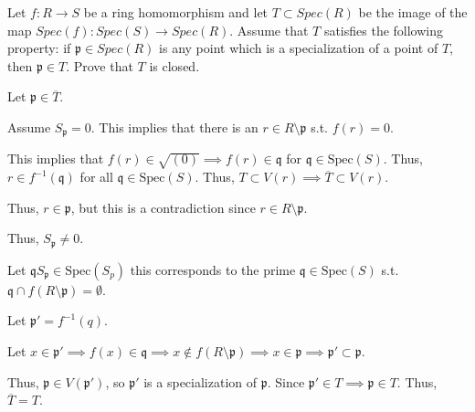 \documentclass[12pt, letterpaper]{article}
\newcommand{\p}{\mathfrak{p}}
\newcommand{\Spec}{\mathrm{Spec}}
\newcommand{\mf}[1]{\mathfrak{#1}}
\begin{document}
\begin{subproblem}{}
    Let $f : R \to S$ be a ring homomorphism and let $T \subset Spec(R)$ be the image of the
map $Spec(f ) : Spec(S) \to Spec(R)$. Assume that $T$ satisfies the following property: if
$\p \in Spec(R)$ is any point which is a specialization of a point of $T$, then $\p \in T$. Prove
that $T$ is closed.
\end{subproblem}
\begin{problemproof}
    Let $\p \in \overline{T}$.

    Assume $S_\p = 0$. This implies that there is an $r \in R \setminus \p$ s.t. $f(r)=0$. 
    
    This implies that $f(r) \in \sqrt{(0)} \implies f(r) \in \mf{q}$ for $\mf{q} \in \Spec(S)$. Thus, $r \in f^{-1}(\mf{q})$ for all $\mf{q} \in \Spec(S)$. Thus, $T \subset V(r) \implies \overline{T} \subset V(r)$.

    Thus, $r \in \p$, but this is a contradiction since $r \in R \setminus \p$.

    Thus, $S_\p \neq 0$.

    Let $\mf{q} S_\p \in \Spec(S_p)$ this corresponds to the prime $\mf{q} \in \Spec(S)$ s.t. $\mf{q} \cap f(R \setminus \p) = \emptyset$.

    Let $\p' = f^{-1}(q)$.

    Let $x \in \p' \implies f(x) \in \mf{q} \implies x \notin f(R \setminus \p) \implies x \in \p \implies \p' \subset \p$.
    
    Thus, $\p \in V(\p')$, so $\p'$ is a specialization of $\p$. Since $\p' \in T \implies \p \in T$. Thus, $\overline{T} = T$.
\end{problemproof}
\end{document}
